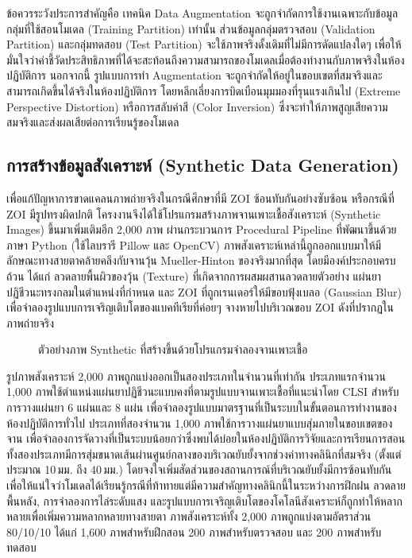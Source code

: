 ข้อควรระวังประการสำคัญคือ เทคนิค Data Augmentation จะถูกจำกัดการใช้งานเฉพาะกับข้อมูลกลุ่มที่ใช้สอนโมเดล (Training Partition) เท่านั้น ส่วนข้อมูลกลุ่มตรวจสอบ (Validation Partition) และกลุ่มทดสอบ (Test Partition) จะใช้ภาพจริงดั้งเดิมที่ไม่มีการดัดแปลงใดๆ เพื่อให้มั่นใจว่าค่าชี้วัดประสิทธิภาพที่ได้จะสะท้อนถึงความสามารถของโมเดลเมื่อต้องทำงานกับภาพจริงในห้องปฏิบัติการ นอกจากนี้ รูปแบบการทำ Augmentation จะถูกจำกัดให้อยู่ในขอบเขตที่สมจริงและสามารถเกิดขึ้นได้จริงในห้องปฏิบัติการ โดยหลีกเลี่ยงการบิดเบือนมุมมองที่รุนแรงเกินไป (Extreme Perspective Distortion) หรือการสลับค่าสี (Color Inversion) ซึ่งจะทำให้ภาพสูญเสียความสมจริงและส่งผลเสียต่อการเรียนรู้ของโมเดล

\subsection{การสร้างข้อมูลสังเคราะห์ (Synthetic Data Generation)}

เพื่อแก้ปัญหาการขาดแคลนภาพถ่ายจริงในกรณีศึกษาที่มี ZOI ซ้อนทับกันอย่างซับซ้อน หรือกรณีที่ ZOI มีรูปทรงผิดปกติ โครงงานจึงได้ใช้โปรแกรมสร้างภาพจานเพาะเชื้อสังเคราะห์ (Synthetic Images) ขึ้นมาเพิ่มเติมอีก 2,000 ภาพ ผ่านกระบวนการ Procedural Pipeline ที่พัฒนาขึ้นด้วยภาษา Python (ใช้ไลบรารี Pillow และ OpenCV) ภาพสังเคราะห์เหล่านี้ถูกออกแบบมาให้มีลักษณะทางสายตาคล้ายคลึงกับจานวุ้น Mueller-Hinton ของจริงมากที่สุด โดยมีองค์ประกอบครบถ้วน ได้แก่ ลวดลายพื้นผิวของวุ้น (Texture) ที่เกิดจากการผสมผสานลวดลายตัวอย่าง แผ่นยาปฏิชีวนะทรงกลมในตำแหน่งที่กำหนด และ ZOI ที่ถูกเรนเดอร์ให้มีขอบฟุ้งเบลอ (Gaussian Blur) เพื่อจำลองรูปแบบการเจริญเติบโตของแบคทีเรียที่ค่อยๆ จางหายไปบริเวณขอบ ZOI ดังที่ปรากฏในภาพถ่ายจริง

\begin{figure}[H]
  \centering
  \caption{ตัวอย่างภาพ Synthetic ที่สร้างขึ้นด้วยโปรแกรมจำลองจานเพาะเชื้อ}
  \label{fig:synthetic_example}
\end{figure}

รูปภาพสังเคราะห์ 2,000 ภาพถูกแบ่งออกเป็นสองประเภทในจำนวนที่เท่ากัน ประเภทแรกจำนวน 1,000 ภาพใช้ตำแหน่งแผ่นยาปฏิชีวนะแบบคงที่ตามรูปแบบจานเพาะเชื้อที่แนะนำโดย CLSI สำหรับการวางแผ่นยา 6 แผ่นและ 8 แผ่น เพื่อจำลองรูปแบบมาตรฐานที่เป็นระบบในขั้นตอนการทำงานของห้องปฏิบัติการทั่วไป ประเภทที่สองจำนวน 1,000 ภาพใช้การวางแผ่นยาแบบสุ่มภายในขอบเขตของจาน เพื่อจำลองการจัดวางที่เป็นระบบน้อยกว่าซึ่งพบได้บ่อยในห้องปฏิบัติการวิจัยและการเรียนการสอน ทั้งสองประเภทมีการสุ่มขนาดเส้นผ่านศูนย์กลางของบริเวณยับยั้งจากช่วงค่าทางคลินิกที่สมจริง (ตั้งแต่ประมาณ 10\,มม. ถึง 40\,มม.) โดยจงใจเพิ่มสัดส่วนของสถานการณ์ที่บริเวณยับยั้งมีการซ้อนทับกัน เพื่อให้แน่ใจว่าโมเดลได้เรียนรู้กรณีที่ท้าทายแต่มีความสำคัญทางคลินิกนี้ในระหว่างการฝึกฝน ลวดลายพื้นหลัง, การจำลองการไล่ระดับแสง และรูปแบบการเจริญเติบโตของโคโลนีสังเคราะห์ก็ถูกทำให้หลากหลายเพื่อเพิ่มความหลากหลายทางสายตา ภาพสังเคราะห์ทั้ง 2,000 ภาพถูกแบ่งตามอัตราส่วน 80/10/10 ได้แก่ 1,600 ภาพสำหรับฝึกสอน 200 ภาพสำหรับตรวจสอบ และ 200 ภาพสำหรับทดสอบ


